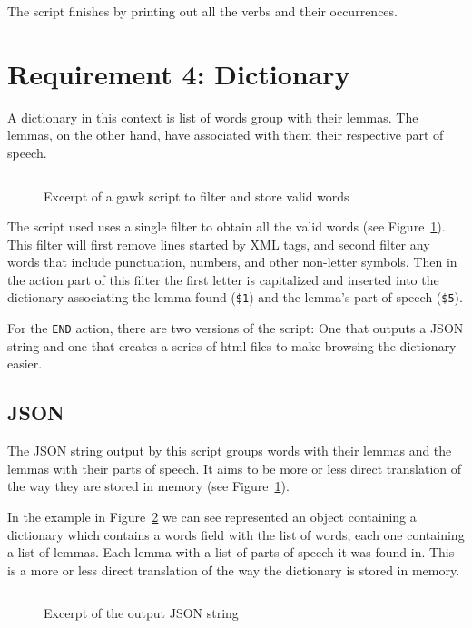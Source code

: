 \documentclass[a4paper]{report}
\begin{document}
The script finishes by printing out all the verbs and their occurrences.

\section{Requirement 4: Dictionary}\label{ssec:dictionary}

A dictionary in this context is list of words group with their lemmas. The
lemmas, on the other hand, have associated with them their respective part of
speech.

\begin{figure}[H]
    \centering
    \inputminted[firstline=3,lastline=6]{awk}{../dictionary_json.awk}
    \caption{Excerpt of a gawk script to filter and store valid
    words}\label{code:dictionary}
\end{figure}

The script used uses a single filter to obtain all the valid words (see
Figure~\ref{code:dictionary}). This filter will first remove lines started by
XML tags, and second filter any words that include punctuation, numbers, and
other non-letter symbols. Then in the action part of this filter the first
letter is capitalized and inserted into the dictionary associating the lemma
found (\texttt{\$1}) and the lemma's part of speech (\texttt{\$5}).

For the \texttt{END} action, there are two versions of the script: One that
outputs a JSON string and one that creates a series of html files to make
browsing the dictionary easier.

\subsection{JSON}\label{ssec:dict-json}

The JSON string output by this script groups words with their lemmas and the
lemmas with their parts of speech. It aims to be more or less direct
translation of the way they are stored in memory (see
Figure~\ref{code:dictionary}).

In the example in Figure~\ref{out:json} we can see represented an object
containing a dictionary which contains a words field with the list of words,
each one containing a list of lemmas. Each lemma with a list of parts of speech
it was found in. This is a more or less direct translation of the way the
dictionary is stored in memory.

\begin{figure}[H]
    \centering
    \inputminted{json}{./dictJson.tex}
    \caption{Excerpt of the output JSON string}\label{out:json}
\end{figure}
\end{document}
